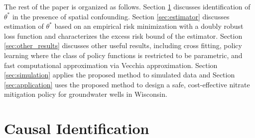 \documentclass[12pt]{article}
\newcommand{\CP}[1]{{\color{purple}From Chan: #1}}
\newcommand{\XL}[1]{{\color{blue}from Xindi: #1}}
\begin{document}


The rest of the paper is organized as follows. Section \ref{sec:setup} discusses identification of $\theta^*$ in the presence of spatial confounding. Section \ref{sec:estimator} discusses estimation of $\theta^*$ based on an empirical
risk minimization with a doubly robust loss function and characterizes the excess risk bound of the estimator. Section \ref{sec:other_results} discusses other useful results, including cross fitting, policy learning where the class of policy functions is restricted to be parametric, and fast computational approximation via Vecchia approximation. Section \ref{sec:simulation} applies the proposed method to simulated data and Section \ref{sec:application} uses the proposed method to design a safe, cost-effective nitrate mitigation policy for groundwater wells in Wisconsin.



\section{Causal Identification}\label{sec:setup}
\end{document}
